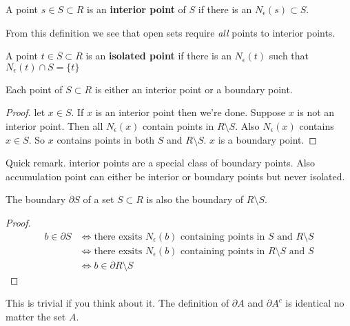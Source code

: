 \documentclass{article}
\begin{document}
\begin{definition}
    A point \( s \in S \subset R \) is an \textbf{interior point} of \( S \) if
    there is an \( N_\epsilon(s) \subset S \).
\end{definition}

From this definition we see that open sets require \textit{all} points to interior points.

\begin{definition}
    A point \( t \in S \subset R \) is an \textbf{isolated point} if there is an
    \( N_\epsilon(t) \) such that \( N_\epsilon(t) \cap S = \{t\} \)
\end{definition}

\begin{proposition}
    Each point of \( S \subset R \) is either an interior point or a boundary point.
\end{proposition}

\begin{proof}
    let \( x \in S \). If \( x \) is an interior point then we're done. Suppose \( x \) 
    is not an interior point. Then all \( N_\epsilon(x) \) contain points in \( R \setminus S \).
    Also  \( N_\epsilon(x) \) contains \( x \in S \). So \( x \) contains points in both 
    \( S \) and \( R \setminus S \). \( x \) is a boundary point.
\end{proof}

Quick remark. interior points are a special class of boundary points. Also accumulation 
point can either be interior or boundary points but never isolated.

\begin{proposition}
    The boundary \( \partial S \) of a set \( S \subset R \) is also the boundary of
    \( R \setminus S \).
\end{proposition}

\begin{proof}
    \begin{align*}
        b \in \partial S  &\iff \text{there exsits }  N_\epsilon(b) \text{ containing points in } S \text{ and  } R \setminus S \\
                          &\iff \text{there exsits }  N_\epsilon(b) \text{ containing points in } R \setminus S \text{ and  } S \\
                            &\iff b \in \partial R \setminus S
    \end{align*}
\end{proof}

This is trivial if you think about it. The definition of \( \partial A \) and \( \partial A^c \)
is identical no matter the set \( A \).
\end{document}
